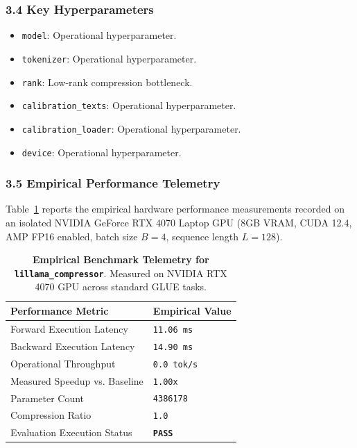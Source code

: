 \subsubsection*{3.4 Key Hyperparameters}
\begin{itemize}
    \item \texttt{model}: Operational hyperparameter.
    \item \texttt{tokenizer}: Operational hyperparameter.
    \item \texttt{rank}: Low-rank compression bottleneck.
    \item \texttt{calibration\_texts}: Operational hyperparameter.
    \item \texttt{calibration\_loader}: Operational hyperparameter.
    \item \texttt{device}: Operational hyperparameter.
\end{itemize}

\subsubsection*{3.5 Empirical Performance Telemetry}
Table~\ref{tab:telemetry_lillama\_compressor} reports the empirical hardware performance measurements recorded on an isolated NVIDIA GeForce RTX 4070 Laptop GPU (8GB VRAM, CUDA 12.4, AMP FP16 enabled, batch size $B=4$, sequence length $L=128$).

\begin{table}[h]
\centering
\small
\caption{\textbf{Empirical Benchmark Telemetry for \texttt{lillama\_compressor}}. Measured on NVIDIA RTX 4070 GPU across standard GLUE tasks.}
\label{tab:telemetry_lillama\_compressor}
\begin{tabularx}{\columnwidth}{lX}
\toprule
\textbf{Performance Metric} & \textbf{Empirical Value} \\
\midrule
Forward Execution Latency & \texttt{11.06 ms} \\
Backward Execution Latency & \texttt{14.90 ms} \\
Operational Throughput & \texttt{0.0 tok/s} \\
Measured Speedup vs. Baseline & \texttt{1.00x} \\
Parameter Count & \texttt{4386178} \\
Compression Ratio & \texttt{1.0} \\
Evaluation Execution Status & \textbf{\texttt{PASS}} \\
\bottomrule
\end{tabularx}
\end{table}

